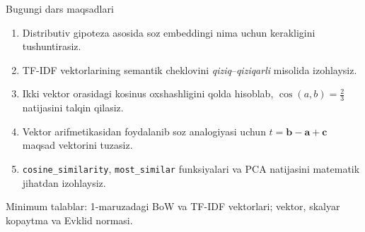 \documentclass[aspectratio=169,11pt]{beamer}
\begin{document}
\begin{frame}{Bugungi dars maqsadlari}
\small
\begin{enumerate}\setlength\itemsep{6pt}
    \item Distributiv gipoteza asosida so\textquotesingle{}z embeddingi nima uchun
          kerakligini tushuntirasiz.

    \item TF-IDF vektorlarining semantik cheklovini
          \textit{qiziq}--\textit{qiziqarli} misolida izohlaysiz.

    \item Ikki vektor orasidagi kosinus o\textquotesingle{}xshashligini
          qo\textquotesingle{}lda hisoblab,
          $\cos(a,b)=\frac{2}{3}$ natijasini talqin qilasiz.

    \item Vektor arifmetikasidan foydalanib so\textquotesingle{}z analogiyasi uchun
          $t=\mathbf{b}-\mathbf{a}+\mathbf{c}$ maqsad vektorini tuzasiz.

    \item \texttt{cosine\_similarity}, \texttt{most\_similar}
          funksiyalari va PCA natijasini matematik jihatdan izohlaysiz.
\end{enumerate}

\vfill

\begin{tcolorbox}[defbox]
\footnotesize
Minimum talablar: 1-ma\textquotesingle{}ruzadagi BoW va TF-IDF vektorlari;
vektor, skalyar ko\textquotesingle{}paytma va Evklid normasi.
\end{tcolorbox}
\end{frame}

\end{document}
